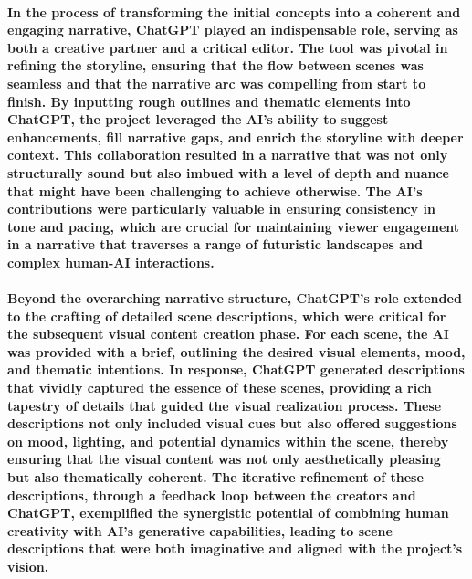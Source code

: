 \documentclass[11pt,a4paper,oneside]{report}
\begin{document}
\paragraph{In the process of transforming the initial concepts into a coherent and engaging narrative, ChatGPT played an indispensable role, serving as both a creative partner and a critical editor. The tool was pivotal in refining the storyline, ensuring that the flow between scenes was seamless and that the narrative arc was compelling from start to finish. By inputting rough outlines and thematic elements into ChatGPT, the project leveraged the AI's ability to suggest enhancements, fill narrative gaps, and enrich the storyline with deeper context. This collaboration resulted in a narrative that was not only structurally sound but also imbued with a level of depth and nuance that might have been challenging to achieve otherwise. The AI's contributions were particularly valuable in ensuring consistency in tone and pacing, which are crucial for maintaining viewer engagement in a narrative that traverses a range of futuristic landscapes and complex human-AI interactions.}

\paragraph{Beyond the overarching narrative structure, ChatGPT's role extended to the crafting of detailed scene descriptions, which were critical for the subsequent visual content creation phase. For each scene, the AI was provided with a brief, outlining the desired visual elements, mood, and thematic intentions. In response, ChatGPT generated descriptions that vividly captured the essence of these scenes, providing a rich tapestry of details that guided the visual realization process. These descriptions not only included visual cues but also offered suggestions on mood, lighting, and potential dynamics within the scene, thereby ensuring that the visual content was not only aesthetically pleasing but also thematically coherent. The iterative refinement of these descriptions, through a feedback loop between the creators and ChatGPT, exemplified the synergistic potential of combining human creativity with AI's generative capabilities, leading to scene descriptions that were both imaginative and aligned with the project's vision.}
\end{document}
